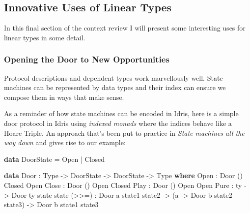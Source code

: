 \documentclass[
]{article}
\newenvironment{Shaded}{}{}
\newcommand{\DataTypeTok}[1]{\textcolor[rgb]{0.56,0.13,0.00}{#1}}
\newcommand{\KeywordTok}[1]{\textcolor[rgb]{0.00,0.44,0.13}{\textbf{#1}}}
\newcommand{\NormalTok}[1]{#1}
\newcommand{\OperatorTok}[1]{\textcolor[rgb]{0.40,0.40,0.40}{#1}}
\newcommand{\OtherTok}[1]{\textcolor[rgb]{0.00,0.44,0.13}{#1}}
\begin{document}
\hypertarget{innovative-uses-of-linear-types}{%
\subsection{Innovative Uses of Linear
Types}\label{innovative-uses-of-linear-types}}

In this final section of the context review I will present some
interesting uses for linear types in some detail.

\hypertarget{opening-the-door-to-new-opportunities}{%
\subsubsection{Opening the Door to New
Opportunities}\label{opening-the-door-to-new-opportunities}}

Protocol descriptions and dependent types work marvellously well. State
machines can be represented by data types and their index can ensure we
compose them in ways that make sense.

As a reminder of how state machines can be encoded in Idris, here is a
simple door protocol in Idris using \emph{indexed monads}
\cite{parameterised_computation} where the indices behave like a Hoare
Triple. An approach that's been put to practice in \emph{State machines
all the way down}\cite{state_machines} and gives rise to our example:

\begin{Shaded}
\begin{Highlighting}[]
\KeywordTok{data} \DataTypeTok{DoorState} \OtherTok{=} \DataTypeTok{Open} \OperatorTok{|} \DataTypeTok{Closed}

\KeywordTok{data} \DataTypeTok{Door} \OperatorTok{:} \DataTypeTok{Type} \OtherTok{{-}\textgreater{}} \DataTypeTok{DoorState} \OtherTok{{-}\textgreater{}} \DataTypeTok{DoorState} \OtherTok{{-}\textgreater{}} \DataTypeTok{Type} \KeywordTok{where} 
    \DataTypeTok{Open} \OperatorTok{:} \DataTypeTok{Door}\NormalTok{ () }\DataTypeTok{Closed} \DataTypeTok{Open}
    \DataTypeTok{Close} \OperatorTok{:} \DataTypeTok{Door}\NormalTok{ () }\DataTypeTok{Open} \DataTypeTok{Closed}
    \DataTypeTok{Play} \OperatorTok{:} \DataTypeTok{Door}\NormalTok{ () }\DataTypeTok{Open} \DataTypeTok{Open}
    \DataTypeTok{Pure} \OperatorTok{:}\NormalTok{ ty }\OtherTok{{-}\textgreater{}} \DataTypeTok{Door}\NormalTok{ ty state state}
\NormalTok{    (}\OperatorTok{\textgreater{}\textgreater{}=}\NormalTok{) }\OperatorTok{:} \DataTypeTok{Door}\NormalTok{ a state1 state2 }\OtherTok{{-}\textgreater{}}
\NormalTok{             (a }\OtherTok{{-}\textgreater{}} \DataTypeTok{Door}\NormalTok{ b state2 state3) }\OtherTok{{-}\textgreater{}}
             \DataTypeTok{Door}\NormalTok{ b state1 state3}
\end{Highlighting}
\end{Shaded}
\end{document}
